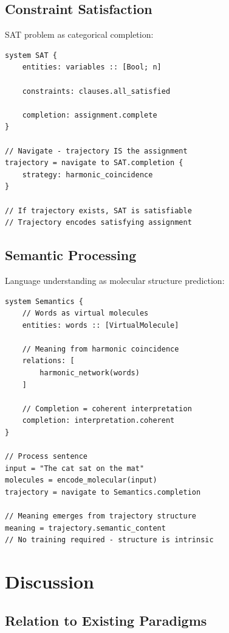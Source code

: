 \documentclass[twocolumn,10pt]{article}
\theoremstyle{remark}
\begin{document}
\subsection{Constraint Satisfaction}

SAT problem as categorical completion:

\begin{lstlisting}
system SAT {
    entities: variables :: [Bool; n]

    constraints: clauses.all_satisfied

    completion: assignment.complete
}

// Navigate - trajectory IS the assignment
trajectory = navigate to SAT.completion {
    strategy: harmonic_coincidence
}

// If trajectory exists, SAT is satisfiable
// Trajectory encodes satisfying assignment
\end{lstlisting}

\subsection{Semantic Processing}

Language understanding as molecular structure prediction:

\begin{lstlisting}
system Semantics {
    // Words as virtual molecules
    entities: words :: [VirtualMolecule]

    // Meaning from harmonic coincidence
    relations: [
        harmonic_network(words)
    ]

    // Completion = coherent interpretation
    completion: interpretation.coherent
}

// Process sentence
input = "The cat sat on the mat"
molecules = encode_molecular(input)
trajectory = navigate to Semantics.completion

// Meaning emerges from trajectory structure
meaning = trajectory.semantic_content
// No training required - structure is intrinsic
\end{lstlisting}

\section{Discussion}
\label{sec:discussion}

\subsection{Relation to Existing Paradigms}
\end{document}
